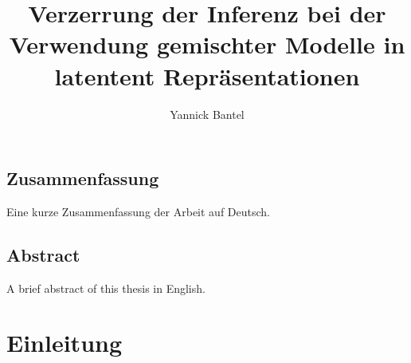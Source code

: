 \documentclass[%
thesis=student,%
coverpage=false,%
titlepage=false,%
headmarks=true, %
german,%
font=libertine, %
math=newpxtx, %
BCOR=5mm,%
coverBCOR=11mm%
]{tumbook}
\title{Verzerrung der Inferenz bei der Verwendung gemischter Modelle in latentent Repräsentationen}
\author{Yannick Bantel}
\theoremstyle{break}
\begin{document}
\frontmatter
\maketitle
\section*{Zusammenfassung}
Eine kurze Zusammenfassung der Arbeit auf Deutsch.

\section*{Abstract}
A brief abstract of this thesis in English.

\cleardoublepage{}

\tableofcontents

\mainmatter{}

\chapter{Einleitung}
\end{document}
